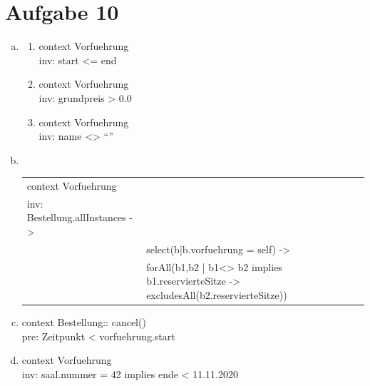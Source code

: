 \section*{Aufgabe 10}
\begin{enumerate} [a)]
	\item \begin{enumerate} [1.]
		\item context Vorfuehrung \\
		inv: start <= end
		\item context Vorfuehrung\\
		inv: grundpreis > 0.0
		\item context Vorfuehrung \\
		inv: name <> “”
	\end{enumerate}
\item \phantom{a}\\
\begin{tabular}{ll}
	context Vorfuehrung&\\
	inv: Bestellung.allInstances ->&\\
	&select(b|b.vorfuehrung = self) ->\\
	&forAll(b1,b2 | b1<> b2 implies b1.reservierteSitze -> excludesAll(b2.reservierteSitze))\\
\end{tabular}
\item context Bestellung:: cancel()\\
pre: Zeitpunkt < vorfuehrung.start
\item context Vorfuehrung \\
inv: saal.nummer = 42 implies ende < 11.11.2020
\end{enumerate}
